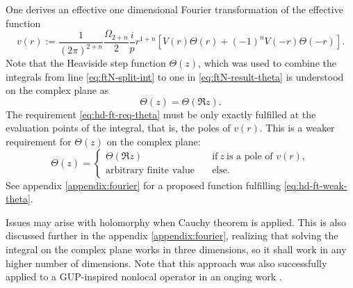 \documentclass[12pt,a4paper]{report}
\numberwithin{equation}{chapter}
\begin{document}
One derives an effective one dimensional Fourier transformation of the effective function
\begin{equation}
v(r) :=
\frac{1}{(2\pi)^{2+n}} \frac{\Omega_{2+n}}2 \frac{i}{p} r^{1+n} \left[ V(r) \Theta(r) + (-1)^n V(-r) \Theta(-r) \right].
\end{equation}
Note that the Heaviside step function $\Theta(z)$, which was used to combine the integrals from line \eqref{eq:ftN-split-int} to one in \eqref{eq:ftN-result-theta} is understood on the complex plane as
\begin{equation}\label{eq:hd-ft-req-theta}
\Theta(z) = \Theta(\Re z).
\end{equation}
The requirement \eqref{eq:hd-ft-req-theta} must be only exactly fulfilled at the evaluation points of the integral, that is, the poles of $v(r)$. This is a weaker requirement for $\Theta(z)$ on the complex plane:
\begin{equation}\label{eq:hd-ft-weak-theta}
\Theta(z) =
\begin{cases}
\Theta(\Re z) \quad &\text{if}~ z~\text{is a pole of } v(r), \\
\text{arbitrary finite value} \quad & \text{else}.
\end{cases}
\end{equation}
See appendix \ref{appendix:fourier} for a proposed function fulfilling \eqref{eq:hd-ft-weak-theta}.

Issues may arise with holomorphy when Cauchy theorem is applied. This is also discussed further in the appendix \ref{appendix:fourier}, realizing that solving the integral on the complex plane works in three dimensions, so it shall work in any higher number of dimensions. Note that this approach was also successfully applied to a GUP-inspired nonlocal operator in an onging work \cite{Knipfer2014}.
\end{document}
